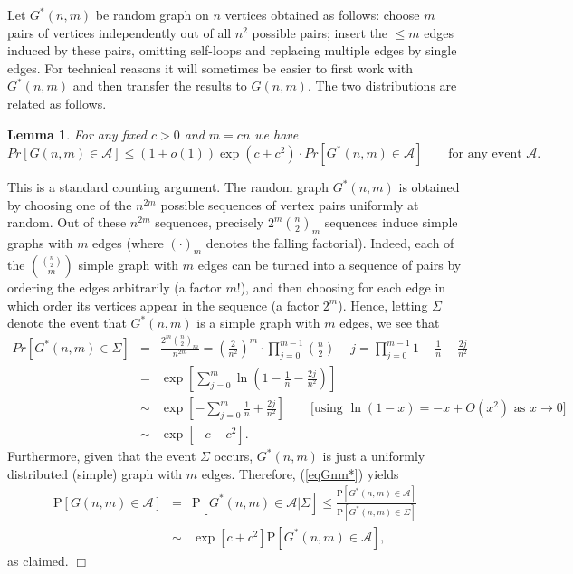 \documentclass[a4paper,10pt]{article}
\makeatletter
\newtheorem{lemma}{Lemma}\renewcommand{\thelemma}{\arabic{lemma}}
\newenvironment{proof}{\noindent{\bf Proof\@:}}{\hfill $\Box$\\}
\newcommand\cA{\mathcal{A}}
\newcommand\pr{\mathrm{P}}
\newcommand{\bink}[2] {{{#1}\choose {#2}}}
\newcommand\ra{\rightarrow}
\newcommand\bc[1]{\left({#1}\right)}
\newcommand\bcfr[2]{\bc{\frac{#1}{#2}}}
\newcommand\brk[1]{\left\lbrack{#1}\right\rbrack}
\makeatother
\begin{document}
Let $G^*(n,m)$ be random graph on $n$ vertices obtained as follows:
choose $m$ pairs of vertices independently out of all $n^2$ possible
pairs; insert the $\leq m$ edges induced by these pairs, omitting
self-loops and replacing multiple edges by single edges. For technical
reasons it will sometimes be easier to first work with $G^*(n,m)$
and  then transfer the results to $G(n,m)$. The two distributions
are related as follows.


\begin{lemma}\label{lemma:model-equivalence}
For any fixed $c>0$ and $m=cn$ we have
\begin{displaymath}
Pr[G(n,m)\in\cA]\leq (1+o(1))\exp(c+c^2)\cdot 
		Pr[G^*(n,m)\in\cA]\qquad\mbox{for any event $\cA$}.
\end{displaymath}
\end{lemma}
\begin{proof}
This is a standard counting argument. The random graph $G^*(n,m)$ is
obtained by choosing one of the $n^{2m}$ possible sequences of vertex
pairs uniformly at random. Out of these $n^{2m}$ sequences, precisely
$2^m\bink n2_m$ sequences induce simple graphs with $m$ edges (where
$\bc\cdot_m$ denotes the falling factorial). Indeed, each of the
$\bink{\bink n2}m$ simple graph with $m$ edges can be turned into
a sequence of pairs by ordering the edges arbitrarily (a factor $m!$),
and then choosing for each edge in which order its vertices appear in
the sequence (a factor $2^m$). Hence, letting $\Sigma$ denote the event
that $G^*(n,m)$ is a simple graph with $m$ edges, we see that
	\begin{eqnarray}\nonumber
	Pr[G^*(n,m)\in\Sigma]&=&\frac{2^m\bink n2_m}{n^{2m}}
		=\bcfr 2{n^2}^m\cdot\prod_{j=0}^{m-1}\bink n2-j
			=\prod_{j=0}^{m-1}1-\frac1n-\frac{2j}{n^2}\\
		&=&\exp\brk{\sum_{j=0}^m\ln\bc{1-\frac1n-\frac{2j}{n^2}}}\nonumber\\
		&\sim&\exp\brk{-\sum_{j=0}^m\frac1n+\frac{2j}{n^2}}\qquad\mbox{[using $\ln(1-x)=-x+O(x^2)$ as $x\ra0$]}\nonumber\\
		&\sim&\exp\brk{-c-c^2}.
			\label{eqGnm*}
	\end{eqnarray}
Furthermore, given that the event $\Sigma$ occurs, $G^*(n,m)$ is
just a uniformly distributed (simple) graph with $m$ edges. 
Therefore,  (\ref{eqGnm*}) yields
	\begin{eqnarray*}
	\pr\brk{G(n,m)\in\cA}&=&\pr\brk{G^*(n,m)\in\cA|\Sigma}
		\leq\frac{\pr\brk{G^*(n,m)\in\cA}}{\pr\brk{G^*(n,m)\in\Sigma}}\\
		&\sim&\exp\brk{c+c^2}\pr\brk{G^*(n,m)\in\cA},
	\end{eqnarray*}
as claimed.
\end{proof}
\end{document}
